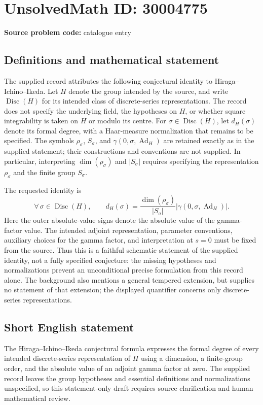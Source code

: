 \documentclass[11pt]{article}
\begin{document}
\section*{UnsolvedMath ID: 30004775}
\textbf{Source problem code:} catalogue entry
\subsection{Definitions and mathematical statement}
The supplied record attributes the following conjectural identity to Hiraga--Ichino--Ikeda. Let \(H\) denote the group intended by the source, and write \(\operatorname{Disc}(H)\) for its intended class of discrete-series representations. The record does not specify the underlying field, the hypotheses on \(H\), or whether square integrability is taken on \(H\) or modulo its centre. For \(\sigma\in\operatorname{Disc}(H)\), let \(d_H(\sigma)\) denote its formal degree, with a Haar-measure normalization that remains to be specified. The symbols \(\rho_\sigma\), \(S_\sigma\), and \(\gamma(0,\sigma,\operatorname{Ad}_H)\) are retained exactly as in the supplied statement; their constructions and conventions are not supplied. In particular, interpreting \(\dim(\rho_\sigma)\) and \(|S_\sigma|\) requires specifying the representation \(\rho_\sigma\) and the finite group \(S_\sigma\).

The requested identity is
\[
\forall\,\sigma\in\operatorname{Disc}(H),\qquad
 d_H(\sigma)
 =\frac{\dim(\rho_\sigma)}{|S_\sigma|}
 \left|\gamma\!\left(0,\sigma,\operatorname{Ad}_H\right)\right|.
\]
Here the outer absolute-value signs denote the absolute value of the gamma-factor value. The intended adjoint representation, parameter conventions, auxiliary choices for the gamma factor, and interpretation at \(s=0\) must be fixed from the source. Thus this is a faithful schematic statement of the supplied identity, not a fully specified conjecture: the missing hypotheses and normalizations prevent an unconditional precise formulation from this record alone. The background also mentions a general tempered extension, but supplies no statement of that extension; the displayed quantifier concerns only discrete-series representations.
\subsection{Short English statement}
The Hiraga--Ichino--Ikeda conjectural formula expresses the formal degree of every intended discrete-series representation of \(H\) using a dimension, a finite-group order, and the absolute value of an adjoint gamma factor at zero. The supplied record leaves the group hypotheses and essential definitions and normalizations unspecified, so this statement-only draft requires source clarification and human mathematical review.
\end{document}
